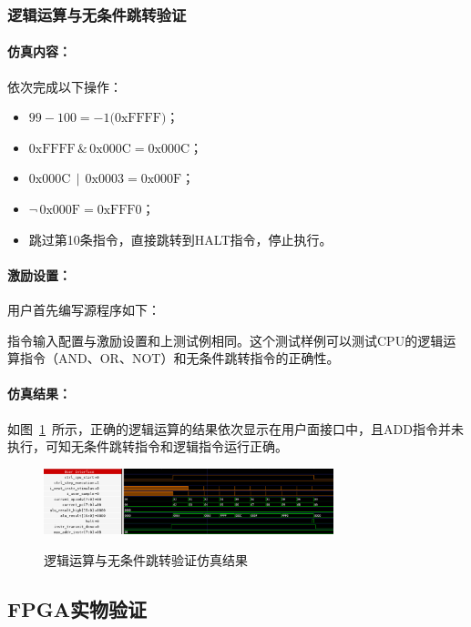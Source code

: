 \documentclass[lang=cn,a4paper,newtx]{elegantpaper}
\begin{document}
\subsubsection{逻辑运算与无条件跳转验证}
\paragraph{仿真内容：}
依次完成以下操作：
\begin{itemize}
  \item $99 - 100 = -1 \text{(0xFFFF)}$；
  \item $\text{0xFFFF} \,\&\, \text{0x000C} = \text{0x000C}$；
  \item $\text{0x000C} \,\mid\, \text{0x0003} = \text{0x000F}$；
  \item $\neg\, \text{0x000F} = \text{0xFFF0}$；
  \item 跳过第10条指令，直接跳转到HALT指令，停止执行。
\end{itemize}

\paragraph{激励设置：}

用户首先编写源程序如下：


指令输入配置与激励设置和上测试例相同。这个测试样例可以测试CPU的逻辑运算指令（AND、OR、NOT）和无条件跳转指令的正确性。

\paragraph{仿真结果：}
如图~\ref{fig:sim:4}~所示，正确的逻辑运算的结果依次显示在用户面接口中，且ADD指令并未执行，可知无条件跳转指令和逻辑指令运行正确。
\begin{figure}[htbp]
  \centering
  \caption{逻辑运算与无条件跳转验证仿真结果}
  \includegraphics[width = 0.75\textwidth]{figure/cpu_sim_logic.png}
  \label{fig:sim:4}
\end{figure}


\subsection{FPGA实物验证}
\end{document}
